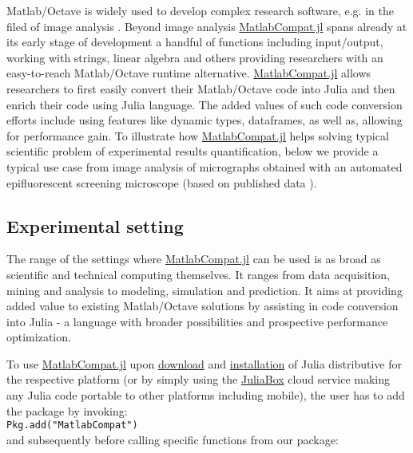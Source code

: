 Matlab/Octave is widely used to develop complex research software, e.g. in the filed of image analysis \cite{Kiss_2014, 17076895}. Beyond image analysis \href{https://github.com/MatlabCompat/MatlabCompat.jl}{MatlabCompat.jl} spans already at its early stage of development a handful of functions including input/output, working with strings, linear algebra and others providing researchers with an easy-to-reach Matlab/Octave runtime alternative. \href{https://github.com/MatlabCompat/MatlabCompat.jl}{MatlabCompat.jl} allows researchers to first easily convert their Matlab/Octave code into Julia and then enrich their code using Julia language. The added values of such code conversion efforts include using features like dynamic types, dataframes, as well as, allowing for performance gain. To illustrate how \href{https://github.com/MatlabCompat/MatlabCompat.jl}{MatlabCompat.jl} helps solving typical scientific problem of experimental results quantification, below we provide a typical use case from image analysis of micrographs obtained with an automated epifluorescent screening microscope (based on published data \cite{22787215}).

\subsection{Experimental setting}

The range of the settings where \href{https://github.com/MatlabCompat/MatlabCompat.jl}{MatlabCompat.jl} can be used is as broad as scientific and technical computing themselves. It ranges from data acquisition, mining and analysis to modeling, simulation and prediction. It aims at providing added value to existing Matlab/Octave solutions by assisting in code conversion into Julia - a language with broader possibilities and prospective performance optimization.

To use \href{https://github.com/MatlabCompat/MatlabCompat.jl}{MatlabCompat.jl} upon \href{http://julialang.org/downloads/}{download} and \href{http://docs.julialang.org/en/release-0.3/manual/getting-started/}{installation} of Julia distributive for the respective platform (or by simply using the \href{https://www.juliabox.org/}{JuliaBox} cloud service making any Julia code portable to other platforms including mobile), the user has to add the package by invoking:\\

\verb|Pkg.add("MatlabCompat")|\\

and subsequently before calling specific functions from our package:\\

